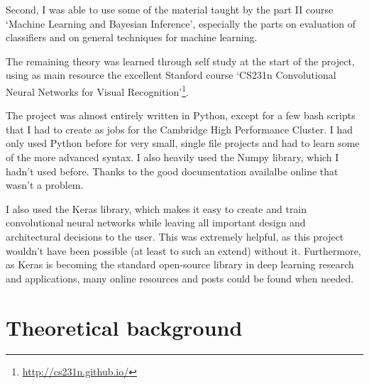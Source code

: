 \documentclass[12pt,a4paper,twoside,openright]{report}
\begin{document}
Second, I was able to use some of the material taught by the part II course `Machine Learning and Bayesian Inference', especially the parts on evaluation of classifiers and on general techniques for machine learning.

The remaining theory was learned through self study at the start of the project, using as main resource the excellent Stanford course `CS231n Convolutional Neural Networks for Visual Recognition'\footnote{\url{http://cs231n.github.io/}}.

The project was almost entirely written in Python, except for a few bash scripts that I had to create as jobs for the Cambridge High Performance Cluster. I had only used Python before for very small, single file projects and had to learn some of the more advanced syntax. I also heavily used the Numpy library, which I hadn't used before. Thanks to the good documentation availalbe online that wasn't a problem.

I also used the Keras library, which makes it easy to create and train convolutional neural networks while leaving all important design and architectural decisions to the user. This was extremely helpful, as this project wouldn't have been possible (at least to such an extend) without it. Furthermore, as Keras is becoming the standard open-source library in deep learning research and applications, many online resources and posts could be found when needed.

\section{Theoretical background}
\end{document}
